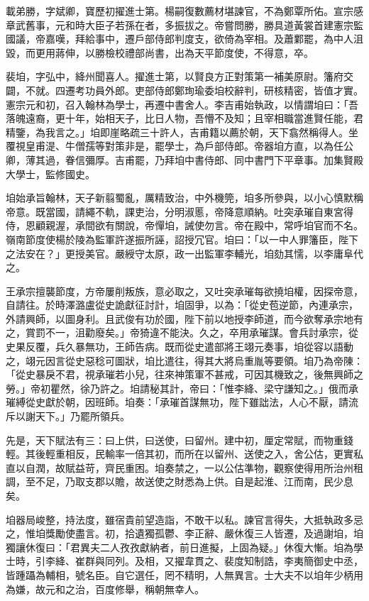\begin{pinyinscope}
 載弟勝，字斌卿，寶歷初擢進士第。楊嗣復數薦材堪諫官，不為鄭覃所佑。宣宗感章武舊事，元和時大臣子若孫在者，多振拔之。帝嘗問勝，勝具道黃裳首建憲宗監國議，帝嘉嘆，拜給事中，遷戶部侍郎判度支，欲倚為宰相。及蕭鄴罷，為中人沮毀，而更用蔣伸，以勝檢校禮部尚書，出為天平節度使，不得意，卒。



 裴垍，字弘中，絳州聞喜人。擢進士第，以賢良方正對策第一補美原尉。籓府交闢，不就。四遷考功員外郎。吏部侍郎鄭珣瑜委垍校辭判，研核精密，皆值才實。憲宗元和初，召入翰林為學士，再遷中書舍人。李吉甫始執政，以情謂垍曰：「吾落魄遠裔，更十年，始相天子，比日人物，吾懵不及知；且宰相職當進賢任能，君精鑒，為我言之。」垍即崖略疏三十許人，吉甫籍以薦於朝，天下翕然稱得人。坐覆視皇甫湜、牛僧孺等對策非是，罷學士，為戶部侍郎。帝器垍方直，以為任公卿，薄其過，眷信彌厚。吉甫罷，乃拜垍中書侍郎、同中書門下平章事。加集賢殿大學士，監修國史。



 垍始承旨翰林，天子新翦蜀亂，厲精致治，中外機筦，垍多所參與，以小心慎默稱帝意。既當國，請繩不軌，課吏治，分明淑慝，帝降意順納。吐突承璀自東宮得侍，恩顧親渥，承間欲有關說，帝憚垍，誡使勿言。帝在殿中，常呼垍官而不名。嶺南節度使楊於陵為監軍許遂振所誣，詔授冗官。垍曰：「以一中人罪籓臣，陛下之法安在？」更授美官。嚴綬守太原，政一出監軍李輔光，垍劾其懦，以李庸阜代之。



 王承宗擅襲節度，方帝屢削叛族，意必取之，又吐突承璀每欲撓垍權，因探帝意，自請往。於時澤潞盧從史詭獻征討計，垍固爭，以為：「從史苞逆節，內連承宗，外請興師，以圖身利。且武俊有功於國，陛下前以地授李師道，而今欲奪承宗地有之，賞罰不一，沮勸廢矣。」帝猗違不能決。久之，卒用承璀謀。會兵討承宗，從史果反覆，兵久暴無功，王師告病。既而從史遣部將王翊元奏事，垍從容以語動之，翊元因言從史惡稔可圖狀，垍比遣往，得其大將烏重胤等要領。垍乃為帝陳：「從史暴戾不君，視承璀若小兒，往來神策軍不甚戒，可因其機致之，後無興師之勞。」帝初瞿然，徐乃許之。垍請秘其計，帝曰：「惟李絳、梁守謙知之。」俄而承璀縛從史獻於朝，因班師。垍奏：「承璀首謀無功，陛下雖詘法，人心不厭，請流斥以謝天下。」乃罷所領兵。



 先是，天下賦法有三：曰上供，曰送使，曰留州。建中初，厘定常賦，而物重錢輕。其後輕重相反，民輸率一倍其初，而所在以留州、送使之入，舍公估，更實私直以自潤，故賦益苛，齊民重困。垍奏禁之，一以公估準物，觀察使得用所治州租調，至不足，乃取支郡以贍，故送使之財悉為上供。自是起淮、江而南，民少息矣。



 垍器局峻整，持法度，雖宿貴前望造詣，不敢干以私。諫官言得失，大抵執政多忌之，惟垍獎勵使盡言。初，拾遺獨孤鬱、李正辭、嚴休復三人皆遷，及過謝垍，垍獨讓休復曰：「君異夫二人孜孜獻納者，前日進擬，上固為疑。」休復大慚。垍為學士時，引李絳、崔群與同列。及相，又擢韋貫之、裴度知制誥，李夷簡御史中丞，皆踵躡為輔相，號名臣。自它選任，罔不精明，人無異言。士大夫不以垍年少柄用為嫌，故元和之治，百度修舉，稱朝無幸人。




\end{pinyinscope}

